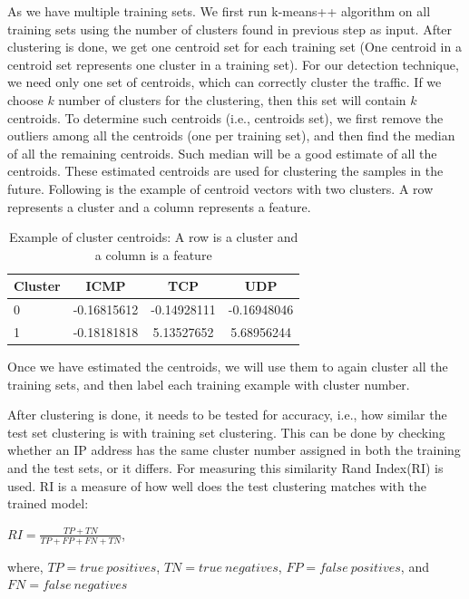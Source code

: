 \documentclass[12pt,oneside,a4paper]{article}
\begin{document}
As we have multiple training sets. We first run k-means++ algorithm on all training sets using the number of clusters found in previous step as input. After clustering is done, we get one centroid set for each training set (One centroid in a centroid set represents one cluster in a training set). For our detection technique, we need only one set of centroids, which can correctly cluster the traffic. If we choose $k$ number of clusters for the clustering, then this set will contain $k$ centroids. To determine such centroids (i.e., centroids set), we first remove the outliers among all the centroids (one per training set), and then find the median of all the remaining centroids. Such median will be a good estimate of all the centroids. These estimated centroids are used for clustering the samples in the future. Following is the example of centroid vectors with two clusters. A row represents a cluster and a column represents a feature.

\begin{table}[H]
\centering
  \begin{tabular}{ l | c  c  c }
    Cluster      & ICMP  & TCP  & UDP \\
    \hline
    0         &{-0.16815612}       &{-0.14928111}    &{-0.16948046} \\
    1         &{-0.18181818}       &{5.13527652}     &{5.68956244} \\
  \end{tabular}
\caption{Example of cluster centroids: A row is a cluster and a column is a feature} \label{table:centroids-example}
\end{table}

Once we have estimated the centroids, we will use them to again cluster all the training sets, and then label each training example with cluster number.

After clustering is done, it needs to be tested for accuracy, i.e., how similar the test set clustering is with training set clustering. This can be done by checking whether an IP address has the same cluster number assigned in both the training and the test sets, or it differs. For measuring this similarity Rand Index(RI)\cite{ri-index} is used. RI is a measure of how well does the test clustering matches with the trained model:

\hspace{4cm} $RI={\frac {TP+TN}{TP+FP+FN+TN}}$,

where,
$TP= true\ positives$, $TN=true\ negatives$, $FP= false\ positives$, and $FN= false\ negatives$
\end{document}
